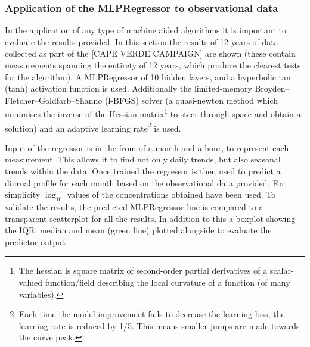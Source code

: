 \subsubsection{Application of the MLPRegressor to observational data}
In the application of any type of machine aided algorithms it is important to evaluate the results provided. In this section the results of 12 years of data collected as part of the [CAPE VERDE CAMPAIGN] are shown (these contain measurements spanning the entirety of 12 years, which produce the clearest tests for the algorithm). A MLPRegressor of 10 hidden layers, and a hyperbolic tan (tanh) activation function is used. Additionally the limited-memory Broyden–Fletcher–Goldfarb–Shanno (l-BFGS) solver (a quasi-newton method which minimises the inverse of the Hessian matrix\footnote{ The hessian is square matrix of second-order partial derivatives of a scalar-valued function/field describing the local curvature of a function (of many variables).} to steer through space and obtain a solution) and an adaptive learning rate\footnote{Each time the model improvement fails to decrease the learning loss, the learning rate is reduced by 1/5. This means smaller jumps are made towards the curve peak. } is used. 

Input of the regressor is in the from of a month and a hour, to represent each measurement. This allows it to find not only daily trends, but also seasonal trends within the data. Once trained the regressor is then used to predict a diurnal profile for each month based on the observational data provided. For simplicity $\log_{10}$ values of the concentrations obtained have been used. To validate the results, the predicted MLPRegressor line is compared to a transparent scatterplot for all the results. In addition to this a boxplot showing the IQR, median and mean (green line) plotted alongside to evaluate the predictor output. 

